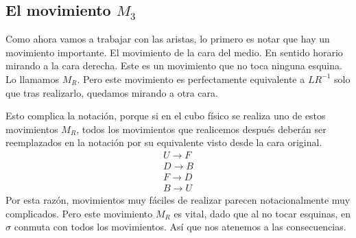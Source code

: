 \documentclass{article}
\theoremstyle{definition}
\begin{document}
\subsection[M3]{El movimiento $M_3$}
Como ahora vamos a trabajar con las aristas, lo primero es notar que hay un movimiento importante. El movimiento de la cara del medio. En sentido horario mirando a la cara derecha. Este es un movimiento que no toca ninguna esquina. Lo llamamos $M_R$. Pero este movimiento es perfectamente equivalente a $LR^{-1}$ solo que tras realizarlo, quedamos mirando a otra cara.

Esto complica la notación, porque si en el cubo físico se realiza uno de estos movimientos $M_R$, todos los movimientos que realicemos después deberán ser reemplazados en la notación por su equivalente visto desde la cara original.
\begin{align*}
    U\to F \\
    D\to B \\
    F\to D \\
    B\to U
\end{align*}
Por esta razón, movimientos muy fáciles de realizar parecen notacionalmente muy complicados. Pero este movimiento $M_R$ es vital, dado que al no tocar esquinas, en $\sigma$ conmuta con todos los movimientos. Así que nos atenemos a las consecuencias.
\end{document}
